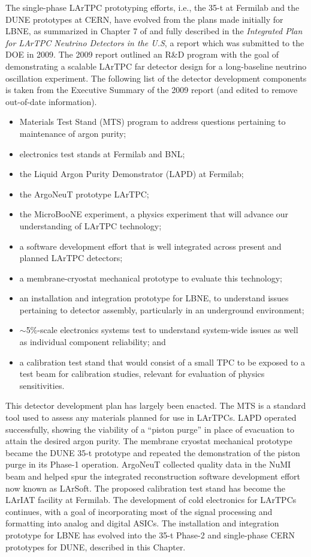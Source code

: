 The single-phase LArTPC prototyping efforts, i.e., the 35-t at
Fermilab and the DUNE prototypes at CERN, have evolved from the plans
made initially for LBNE, as summarized in Chapter 7 of \anxlbnefd{}
and fully described in the \textit{Integrated Plan for LArTPC Neutrino
  Detectors in the U.S}, a report which was submitted to the DOE in
2009.  The 2009 report outlined an R\&D program with the goal of
demonstrating a scalable LArTPC far detector design for a
long-baseline neutrino oscillation experiment.  The following list of
the detector development components is taken from the Executive
Summary of the 2009 report (and edited to remove out-of-date
information).
\begin{itemize}
   \item Materials Test Stand (MTS) program
   to address questions pertaining to maintenance of argon purity;
    \item electronics test stands at Fermilab and BNL;
    \item the Liquid Argon Purity Demonstrator (LAPD) at Fermilab;
    \item the ArgoNeuT prototype LArTPC;
    \item the MicroBooNE experiment, a physics experiment that will
      advance our understanding of LArTPC technology;
    \item a software development effort that is well integrated across
      present and planned LArTPC detectors;
    \item a membrane-cryostat mechanical prototype to evaluate this technology;
    \item an installation and integration prototype for LBNE, to
      understand issues pertaining to detector assembly, particularly
      in an underground environment;
    \item $\sim$5\%-scale electronics systems test to understand
      system-wide issues as well as individual component reliability; and
    \item a calibration test stand that would consist of a small TPC
      to be exposed to a test beam for calibration studies, relevant
      for evaluation of physics sensitivities.
\end{itemize}

This detector development plan has largely been enacted.  The MTS is a
standard tool used to assess any materials planned for use in LArTPCs.
LAPD operated successfully, showing the viability of a ``piston purge'' in
place of evacuation to attain the desired argon purity.  The membrane
cryostat mechanical prototype became the DUNE 35-t prototype and
repeated the demonstration of the piston purge in its Phase-1
operation.  ArgoNeuT collected quality data in the NuMI beam and
helped spur the integrated reconstruction software development effort
now known as LArSoft.  The proposed calibration test stand has become
the LArIAT facility at Fermilab.  The development of cold electronics
for LArTPCs continues, with a goal of incorporating most of the signal
processing and formatting into analog and digital ASICs.  The
installation and integration prototype for LBNE has evolved into the
35-t Phase-2 and single-phase CERN prototypes for DUNE, described
in this Chapter.
 
